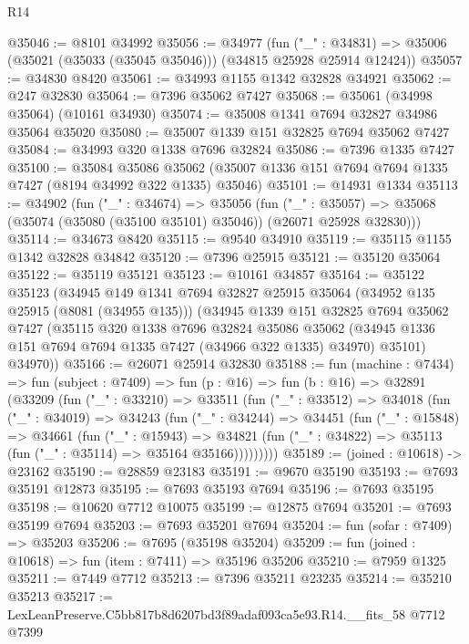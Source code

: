 \begin{lexlean}{R14}
\begin{coremodule}
@35046 := @8101 @34992
@35056 := @34977
    (fun ("_" : @34831) => @35006 (@35021 (@35033 (@35045 @35046))) (@34815 @25928 @25914 @12424))
@35057 := @34830 @8420
@35061 := @34993 @1155 @1342 @32828 @34921
@35062 := @247 @32830
@35064 := @7396 @35062 @7427
@35068 := @35061 (@34998 @35064) (@10161 @34930)
@35074 := @35008 @1341 @7694 @32827 @34986 @35064 @35020
@35080 := @35007 @1339 @151 @32825 @7694 @35062 @7427
@35084 := @34993 @320 @1338 @7696 @32824
@35086 := @7396 @1335 @7427
@35100 := @35084
    @35086
    @35062
    (@35007 @1336 @151 @7694 @7694 @1335 @7427 (@8194 @34992 @322 @1335) @35046)
@35101 := @14931 @1334
@35113 := @34902
    (fun ("_" : @34674) =>
    @35056
      (fun ("_" : @35057) =>
      @35068 (@35074 (@35080 (@35100 @35101) @35046)) (@26071 @25928 @32830)))
@35114 := @34673 @8420
@35115 := @9540 @34910
@35119 := @35115 @1155 @1342 @32828 @34842
@35120 := @7396 @25915
@35121 := @35120 @35064
@35122 := @35119 @35121
@35123 := @10161 @34857
@35164 := @35122
    @35123
    (@34945
      @149
      @1341
      @7694
      @32827
      @25915
      @35064
      (@34952 @135 @25915 (@8081 (@34955 @135)))
      (@34945
        @1339
        @151
        @32825
        @7694
        @35062
        @7427
        (@35115
          @320
          @1338
          @7696
          @32824
          @35086
          @35062
          (@34945 @1336 @151 @7694 @7694 @1335 @7427 (@34966 @322 @1335) @34970)
          @35101)
        @34970))
@35166 := @26071 @25914 @32830
@35188 := fun (machine : @7434) =>
  fun (subject : @7409) =>
  fun (p : @16) =>
  fun (b : @16) =>
  @32891
    (@33209
      (fun ("_" : @33210) =>
      @33511
        (fun ("_" : @33512) =>
        @34018
          (fun ("_" : @34019) =>
          @34243
            (fun ("_" : @34244) =>
            @34451
              (fun ("_" : @15848) =>
              @34661
                (fun ("_" : @15943) =>
                @34821 (fun ("_" : @34822) => @35113 (fun ("_" : @35114) => @35164 @35166)))))))))
@35189 := (joined : @10618) -> @23162
@35190 := @28859 @23183
@35191 := @9670 @35190
@35193 := @7693 @35191 @12873
@35195 := @7693 @35193 @7694
@35196 := @7693 @35195
@35198 := @10620 @7712 @10075
@35199 := @12875 @7694
@35201 := @7693 @35199 @7694
@35203 := @7693 @35201 @7694
@35204 := fun (sofar : @7409) => @35203
@35206 := @7695 (@35198 @35204)
@35209 := fun (joined : @10618) => fun (item : @7411) => @35196 @35206
@35210 := @7959 @1325
@35211 := @7449 @7712
@35213 := @7396 @35211 @23235
@35214 := @35210 @35213
@35217 := LexLeanPreserve.C5bb817b8d6207bd3f89adaf093ca5e93.R14.__fits_58 @7712 @7399

\end{coremodule}
\end{lexlean}
